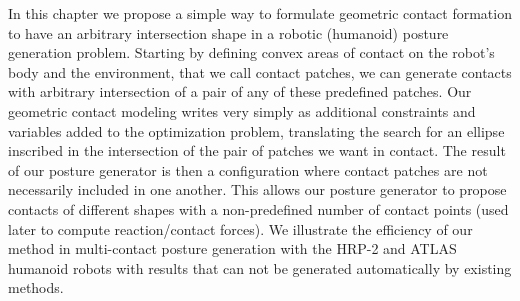 In this chapter we propose a simple way to formulate geometric contact formation to have an arbitrary intersection shape in a robotic (humanoid) posture generation problem.
Starting by defining convex areas of contact on the robot's body and the environment, that we call contact patches, we can generate contacts with arbitrary intersection of a pair of any of these predefined patches.
Our geometric contact modeling writes very simply as additional constraints and variables added to the optimization problem, translating the search for an ellipse inscribed in the intersection of the pair of patches we want in contact.
The result of our posture generator is then a configuration where contact patches are not necessarily included in one another.
This allows our posture generator to propose contacts of different shapes with a non-predefined number of contact points (used later to compute reaction/contact forces).
We illustrate the efficiency of our method in multi-contact posture generation with the HRP-2 and ATLAS humanoid robots with results that can not be generated automatically by existing methods.




